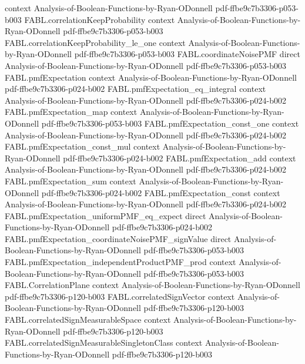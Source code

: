 \begin{theorem}
  {context}
  {Analysis-of-Boolean-Functions-by-Ryan-ODonnell}
  {pdf-ffbe9c7b3306-p053-b003}
\proofstep
  {FABL.correlationKeepProbability}
  {context}
  {Analysis-of-Boolean-Functions-by-Ryan-ODonnell}
  {pdf-ffbe9c7b3306-p053-b003}
\proofstep
  {FABL.correlationKeepProbability_le_one}
  {context}
  {Analysis-of-Boolean-Functions-by-Ryan-ODonnell}
  {pdf-ffbe9c7b3306-p053-b003}
\proofstep
  {FABL.coordinateNoisePMF}
  {direct}
  {Analysis-of-Boolean-Functions-by-Ryan-ODonnell}
  {pdf-ffbe9c7b3306-p053-b003}
\proofstep
  {FABL.pmfExpectation}
  {context}
  {Analysis-of-Boolean-Functions-by-Ryan-ODonnell}
  {pdf-ffbe9c7b3306-p024-b002}
\proofstep
  {FABL.pmfExpectation_eq_integral}
  {context}
  {Analysis-of-Boolean-Functions-by-Ryan-ODonnell}
  {pdf-ffbe9c7b3306-p024-b002}
\proofstep
  {FABL.pmfExpectation_map}
  {context}
  {Analysis-of-Boolean-Functions-by-Ryan-ODonnell}
  {pdf-ffbe9c7b3306-p053-b003}
\proofstep
  {FABL.pmfExpectation_const_one}
  {context}
  {Analysis-of-Boolean-Functions-by-Ryan-ODonnell}
  {pdf-ffbe9c7b3306-p024-b002}
\proofstep
  {FABL.pmfExpectation_const_mul}
  {context}
  {Analysis-of-Boolean-Functions-by-Ryan-ODonnell}
  {pdf-ffbe9c7b3306-p024-b002}
\proofstep
  {FABL.pmfExpectation_add}
  {context}
  {Analysis-of-Boolean-Functions-by-Ryan-ODonnell}
  {pdf-ffbe9c7b3306-p024-b002}
\proofstep
  {FABL.pmfExpectation_sum}
  {context}
  {Analysis-of-Boolean-Functions-by-Ryan-ODonnell}
  {pdf-ffbe9c7b3306-p024-b002}
\proofstep
  {FABL.pmfExpectation_const}
  {context}
  {Analysis-of-Boolean-Functions-by-Ryan-ODonnell}
  {pdf-ffbe9c7b3306-p024-b002}
\proofstep
  {FABL.pmfExpectation_uniformPMF_eq_expect}
  {direct}
  {Analysis-of-Boolean-Functions-by-Ryan-ODonnell}
  {pdf-ffbe9c7b3306-p024-b002}
\proofstep
  {FABL.pmfExpectation_coordinateNoisePMF_signValue}
  {direct}
  {Analysis-of-Boolean-Functions-by-Ryan-ODonnell}
  {pdf-ffbe9c7b3306-p053-b003}
\proofstep
  {FABL.pmfExpectation_independentProductPMF_prod}
  {context}
  {Analysis-of-Boolean-Functions-by-Ryan-ODonnell}
  {pdf-ffbe9c7b3306-p053-b003}
\proofstep
  {FABL.CorrelationPlane}
  {context}
  {Analysis-of-Boolean-Functions-by-Ryan-ODonnell}
  {pdf-ffbe9c7b3306-p120-b003}
\proofstep
  {FABL.correlatedSignVector}
  {context}
  {Analysis-of-Boolean-Functions-by-Ryan-ODonnell}
  {pdf-ffbe9c7b3306-p120-b003}
\proofstep
  {FABL.correlatedSignMeasurableSpace}
  {context}
  {Analysis-of-Boolean-Functions-by-Ryan-ODonnell}
  {pdf-ffbe9c7b3306-p120-b003}
\proofstep
  {FABL.correlatedSignMeasurableSingletonClass}
  {context}
  {Analysis-of-Boolean-Functions-by-Ryan-ODonnell}
  {pdf-ffbe9c7b3306-p120-b003}

\end{theorem}
